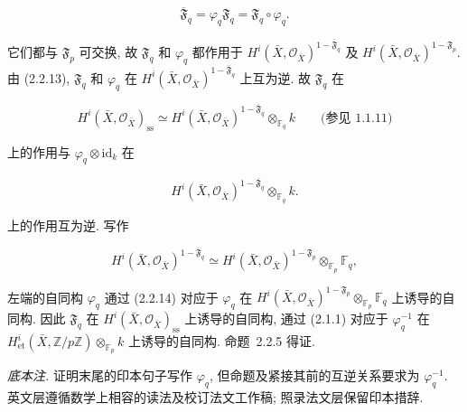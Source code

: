\begin{equation}\tag{2.2.13}
\overline{\mathfrak F}_q
=\varphi_q\mathfrak F_q
=\mathfrak F_q\circ\varphi_q.
\end{equation}

它们都与 $\mathfrak F_p$ 可交换, 故 $\mathfrak F_q$ 和 $\varphi_q$ 都作用于
$H^i(\bar X,\mathcal O_{\bar X})^{1-\overline{\mathfrak F}_q}$ 及
$H^i(\bar X,\mathcal O_{\bar X})^{1-\mathfrak F_p}$.
由 (2.2.13), $\mathfrak F_q$ 和 $\varphi_q$ 在
$H^i(\bar X,\mathcal O_{\bar X})^{1-\overline{\mathfrak F}_q}$ 上互为逆.
故 $\mathfrak F_q$ 在

\[
H^i(\bar X,\mathcal O_{\bar X})_{\mathrm{ss}}
\simeq
H^i(\bar X,\mathcal O_{\bar X})^{1-\overline{\mathfrak F}_q}
\otimes_{\mathbb F_q}k
\qquad\text{(参见 1.1.11)}
\]

上的作用与 $\varphi_q\otimes\mathrm{id}_k$ 在

\[
H^i(\bar X,\mathcal O_{\bar X})^{1-\overline{\mathfrak F}_q}
\otimes_{\mathbb F_q}k.
\]

上的作用互为逆. 写作

\begin{equation}\tag{2.2.14}
H^i(\bar X,\mathcal O_{\bar X})^{1-\overline{\mathfrak F}_q}
\simeq
H^i(\bar X,\mathcal O_{\bar X})^{1-\mathfrak F_p}
\otimes_{\mathbb F_p}\mathbb F_q,
\end{equation}

左端的自同构 $\varphi_q$ 通过 (2.2.14) 对应于 $\varphi_q$ 在
$H^i(\bar X,\mathcal O_{\bar X})^{1-\mathfrak F_p}\otimes_{\mathbb F_p}\mathbb F_q$
上诱导的自同构. 因此 $\mathfrak F_q$ 在 $H^i(\bar X,\mathcal O_{\bar X})_{\mathrm{ss}}$
上诱导的自同构, 通过 (2.1.1) 对应于 $\varphi_q^{-1}$ 在
$H^i_{\mathrm{et}}(\bar X,\mathbb Z/p\mathbb Z)\otimes_{\mathbb F_p}k$
上诱导的自同构. 命题~2.2.5 得证.

\medskip
\noindent\emph{底本注.}
证明末尾的印本句子写作 $\varphi_q$, 但命题及紧接其前的互逆关系要求为 $\varphi_q^{-1}$.
英文层遵循数学上相容的读法及校订法文工作稿; 照录法文层保留印本措辞.
